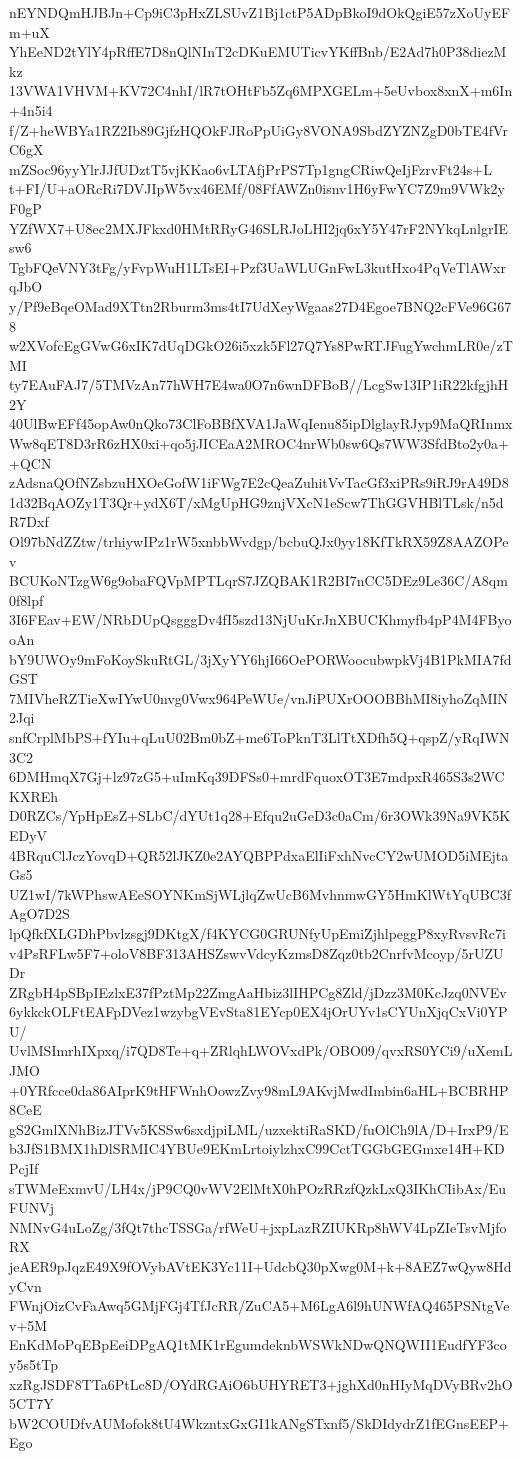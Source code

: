 nEYNDQmHJBJn+Cp9iC3pHxZLSUvZ1Bj1ctP5ADpBkoI9dOkQgiE57zXoUyEFm+uX
YhEeND2tYlY4pRffE7D8nQlNInT2cDKuEMUTicvYKffBnb/E2Ad7h0P38diezMkz
13VWA1VHVM+KV72C4nhI/lR7tOHtFb5Zq6MPXGELm+5eUvbox8xnX+m6In+4n5i4
f/Z+heWBYa1RZ2Ib89GjfzHQOkFJRoPpUiGy8VONA9SbdZYZNZgD0bTE4fVrC6gX
mZSoc96yyYlrJJfUDztT5vjKKao6vLTAfjPrPS7Tp1gngCRiwQeIjFzrvFt24s+L
t+FI/U+aORcRi7DVJIpW5vx46EMf/08FfAWZn0isnv1H6yFwYC7Z9m9VWk2yF0gP
YZfWX7+U8ec2MXJFkxd0HMtRRyG46SLRJoLHI2jq6xY5Y47rF2NYkqLnlgrIEsw6
TgbFQeVNY3tFg/yFvpWuH1LTsEI+Pzf3UaWLUGnFwL3kutHxo4PqVeTlAWxrqJbO
y/Pf9eBqeOMad9XTtn2Rburm3ms4tI7UdXeyWgaas27D4Egoe7BNQ2cFVe96G678
w2XVofcEgGVwG6xIK7dUqDGkO26i5xzk5Fl27Q7Ys8PwRTJFugYwchmLR0e/zTMI
ty7EAuFAJ7/5TMVzAn77hWH7E4wa0O7n6wnDFBoB//LcgSw13IP1iR22kfgjhH2Y
40UlBwEFf45opAw0nQko73ClFoBBfXVA1JaWqIenu85ipDlglayRJyp9MaQRInmx
Ww8qET8D3rR6zHX0xi+qo5jJICEaA2MROC4nrWb0sw6Qs7WW3SfdBto2y0a++QCN
zAdsnaQOfNZsbzuHXOeGofW1iFWg7E2cQeaZuhitVvTacGf3xiPRs9iRJ9rA49D8
1d32BqAOZy1T3Qr+ydX6T/xMgUpHG9znjVXcN1eScw7ThGGVHBlTLsk/n5dR7Dxf
Ol97bNdZZtw/trhiywIPz1rW5xnbbWvdgp/bcbuQJx0yy18KfTkRX59Z8AAZOPev
BCUKoNTzgW6g9obaFQVpMPTLqrS7JZQBAK1R2BI7nCC5DEz9Le36C/A8qm0f8lpf
3I6FEav+EW/NRbDUpQsgggDv4fI5szd13NjUuKrJnXBUCKhmyfb4pP4M4FByooAn
bY9UWOy9mFoKoySkuRtGL/3jXyYY6hjI66OePORWoocubwpkVj4B1PkMIA7fdGST
7MIVheRZTieXwIYwU0nvg0Vwx964PeWUe/vnJiPUXrOOOBBhMI8iyhoZqMIN2Jqi
snfCrplMbPS+fYIu+qLuU02Bm0bZ+me6ToPknT3LlTtXDfh5Q+qspZ/yRqIWN3C2
6DMHmqX7Gj+lz97zG5+uImKq39DFSs0+mrdFquoxOT3E7mdpxR465S3s2WCKXREh
D0RZCs/YpHpEsZ+SLbC/dYUt1q28+Efqu2uGeD3c0aCm/6r3OWk39Na9VK5KEDyV
4BRquClJczYovqD+QR52lJKZ0e2AYQBPPdxaElIiFxhNvcCY2wUMOD5iMEjtaGs5
UZ1wI/7kWPhswAEeSOYNKmSjWLjlqZwUcB6MvhnmwGY5HmKlWtYqUBC3fAgO7D2S
lpQfkfXLGDhPbvlzsgj9DKtgX/f4KYCG0GRUNfyUpEmiZjhlpeggP8xyRvsvRc7i
v4PsRFLw5F7+oloV8BF313AHSZswvVdcyKzmsD8Zqz0tb2CnrfvMcoyp/5rUZUDr
ZRgbH4pSBpIEzlxE37fPztMp22ZmgAaHbiz3lIHPCg8Zld/jDzz3M0KcJzq0NVEv
6ykkckOLFtEAFpDVez1wzybgVEvSta81EYcp0EX4jOrUYv1sCYUnXjqCxVi0YPU/
UvlMSImrhIXpxq/i7QD8Te+q+ZRlqhLWOVxdPk/OBO09/qvxRS0YCi9/uXemLJMO
+0YRfcce0da86AIprK9tHFWnhOowzZvy98mL9AKvjMwdImbin6aHL+BCBRHP8CeE
gS2GmlXNhBizJTVv5KSSw6sxdjpiLML/uzxektiRaSKD/fuOlCh9lA/D+IrxP9/E
b3JfS1BMX1hDlSRMIC4YBUe9EKmLrtoiylzhxC99CctTGGbGEGmxe14H+KDPcjIf
sTWMeExmvU/LH4x/jP9CQ0vWV2ElMtX0hPOzRRzfQzkLxQ3IKhCIibAx/EuFUNVj
NMNvG4uLoZg/3fQt7thcTSSGa/rfWeU+jxpLazRZIUKRp8hWV4LpZIeTsvMjfoRX
jeAER9pJqzE49X9fOVybAVtEK3Yc11I+UdcbQ30pXwg0M+k+8AEZ7wQyw8HdyCvn
FWnjOizCvFaAwq5GMjFGj4TfJcRR/ZuCA5+M6LgA6l9hUNWfAQ465PSNtgVev+5M
EnKdMoPqEBpEeiDPgAQ1tMK1rEgumdeknbWSWkNDwQNQWII1EudfYF3coy5s5tTp
xzRgJSDF8TTa6PtLc8D/OYdRGAiO6bUHYRET3+jghXd0nHIyMqDVyBRv2hO5CT7Y
bW2COUDfvAUMofok8tU4WkzntxGxGI1kANgSTxnf5/SkDIdydrZ1fEGnsEEP+Ego
